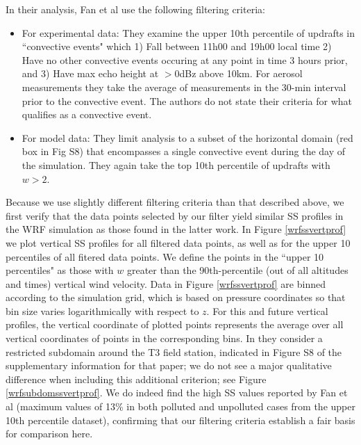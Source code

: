 \documentclass{article}
\begin{document}
In their analysis, Fan et al use the following filtering criteria:
\begin{itemize}
	\item For experimental data: They examine the upper 10th percentile of updrafts in ``convective events" which 1) Fall between 11h00 and 19h00 local time 2) Have no other convective events occuring at any point in time 3 hours prior, and 3) Have max echo height at $>$0dBz above 10km. For aerosol measurements they take the average of measurements in the 30-min interval prior to the convective event. The authors do not state their criteria for what qualifies as a convective event.
	\item For model data: They limit analysis to a subset of the horizontal domain (red box in Fig S8) that encompasses a single convective event during the day of the simulation. They again take the top 10th percentile of updrafts with $w>2$. 
\end{itemize}

Because we use slightly different filtering criteria than that described above, we first verify that the data points selected by our filter yield similar SS profiles in the WRF simulation as those found in the latter work. In Figure \ref{wrfssvertprof} we plot vertical SS profiles for all filtered data points, as well as for the upper 10 percentiles of all fitered data points. We define the points in the ``upper 10 percentiles" as those with $w$ greater than the 90th-percentile (out of all altitudes and times) vertical wind velocity. Data in Figure \ref{wrfssvertprof} are binned according to the simulation grid, which is based on pressure coordinates so that bin size varies logarithmically with respect to $z$. For this and future vertical profiles, the vertical coordinate of plotted points represents the average over all vertical coordinates of points in the corresponding bins. In \cite{Fan2018} they consider a restricted subdomain around the T3 field station, indicated in Figure S8 of the supplementary information for that paper; we do not see a major qualitative difference when including this additional criterion; see Figure \ref{wrfsubdomssvertprof}. We do indeed find the high SS values reported by Fan et al (maximum values of 13\% in both polluted and unpolluted cases from the upper 10th percentile dataset), confirming that our filtering criteria establish a fair basis for comparison here.
\end{document}
